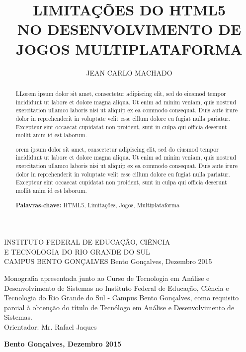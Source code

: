 \documentclass[
12pt,
a4paper,
portuges,
draft
]{report}
\title{\uppercase{Limitações do HTML5 \\ no desenvolvimento de jogos multiplataforma}}
\author{\uppercase{Jean Carlo Machado}}
\newcommand{\university}{\uppercase{Instituto Federal de Educação, Ciência \\ e Tecnologia do Rio Grande do Sul \\ Campus Bento Gonçalves}}
\newcommand{\locale}{Bento Gonçalves, Dezembro 2015}
\begin{document}


\begin{titlepage}
    \begin{center}
        {\fontsize{14}{18}\selectfont \university}
        \vfill
        {\fontsize{16}{19}\selectfont \thetitle }
        \vfill
        {\fontsize{12}{15}\selectfont \theauthor}
        \vfill
        {\locale}
    \end{center}
\end{titlepage}


\begin{titlepage}
    \begin{center}
        {\fontsize{14}{18}\selectfont \theauthor}
        \vfill
        {\fontsize{16}{19}\selectfont \thetitle }
        \vfill
        \hfill
        \parbox[s]{8cm}{
        \singlespacing
            Monografia apresentada junto ao Curso
        de Tecnologia em Análise e Desenvolvimento de Sistemas no
    Instituto Federal de Educação, Ciência e Tecnologia do Rio
Grande do Sul - Campus Bento Gonçalves, como requisito parcial à
obtenção do título de Tecnólogo em Análise e Desenvolvimento de Sistemas.
        \\
        Orientador: Mr. Rafael Jaques
        }
        \vfill
        {\bfseries \locale}
    \end{center}
\end{titlepage}

\onehalfspacing
\renewcommand{\abstractname}{\Large\bfseries RESUMO}
\begin{abstract}
{ LLorem ipsum dolor sit amet, consectetur adipiscing elit, sed do eiusmod tempor incididunt ut labore et dolore magna aliqua. Ut enim ad minim veniam, quis nostrud exercitation ullamco laboris nisi ut aliquip ex ea commodo consequat. Duis aute irure dolor in reprehenderit in voluptate velit esse cillum dolore eu fugiat nulla pariatur. Excepteur sint occaecat cupidatat non proident, sunt in culpa qui officia deserunt mollit anim id est laborum.

orem ipsum dolor sit amet, consectetur adipiscing elit, sed do eiusmod tempor incididunt ut labore et dolore magna aliqua. Ut enim ad minim veniam, quis nostrud exercitation ullamco laboris nisi ut aliquip ex ea commodo consequat. Duis aute irure dolor in reprehenderit in voluptate velit esse cillum dolore eu fugiat nulla pariatur. Excepteur sint occaecat cupidatat non proident, sunt in culpa qui officia deserunt mollit anim id est laborum.
}

{\bfseries Palavras-chave:} HTML5, Limitações, Jogos,
Multiplataforma
\end{abstract}
\end{document}
